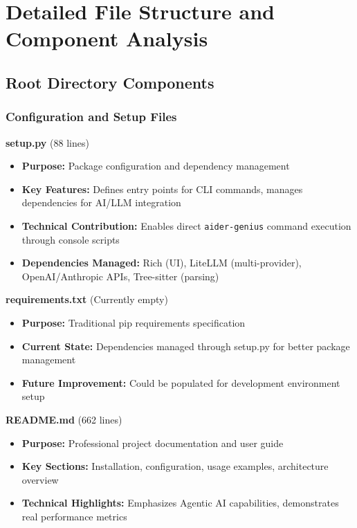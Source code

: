 \documentclass[12pt,a4paper]{article}
\begin{document}
\section{Detailed File Structure and Component Analysis}

\subsection{Root Directory Components}

\subsubsection{Configuration and Setup Files}

\textbf{setup.py} (88 lines)
\begin{itemize}
    \item \textbf{Purpose:} Package configuration and dependency management
    \item \textbf{Key Features:} Defines entry points for CLI commands, manages dependencies for AI/LLM integration
    \item \textbf{Technical Contribution:} Enables direct \texttt{aider-genius} command execution through console scripts
    \item \textbf{Dependencies Managed:} Rich (UI), LiteLLM (multi-provider), OpenAI/Anthropic APIs, Tree-sitter (parsing)
\end{itemize}

\textbf{requirements.txt} (Currently empty)
\begin{itemize}
    \item \textbf{Purpose:} Traditional pip requirements specification
    \item \textbf{Current State:} Dependencies managed through setup.py for better package management
    \item \textbf{Future Improvement:} Could be populated for development environment setup
\end{itemize}

\textbf{README.md} (662 lines)
\begin{itemize}
    \item \textbf{Purpose:} Professional project documentation and user guide
    \item \textbf{Key Sections:} Installation, configuration, usage examples, architecture overview
    \item \textbf{Technical Highlights:} Emphasizes Agentic AI capabilities, demonstrates real performance metrics
\end{itemize}
\end{document}
